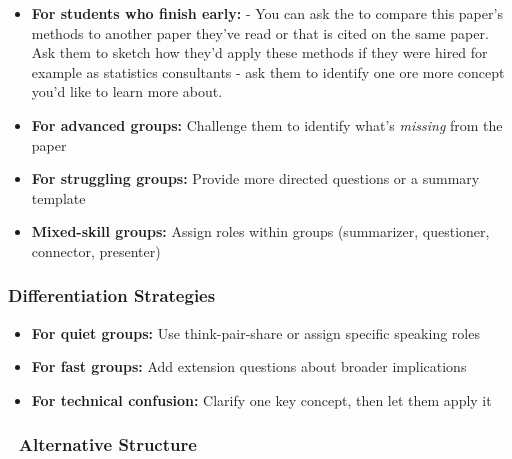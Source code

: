 \documentclass[
  letterpaper,
  DIV=11,
  numbers=noendperiod]{scrartcl}
\providecommand{\tightlist}{%
  \setlength{\itemsep}{0pt}\setlength{\parskip}{0pt}}\usepackage{longtable,booktabs,array}
\begin{document}
\begin{tcolorbox}[enhanced jigsaw, colbacktitle=quarto-callout-note-color!10!white, colframe=quarto-callout-note-color-frame, left=2mm, rightrule=.15mm, breakable, bottomrule=.15mm, toptitle=1mm, arc=.35mm, toprule=.15mm, coltitle=black, colback=white, opacityback=0, bottomtitle=1mm, titlerule=0mm, title=\textcolor{quarto-callout-note-color}{\faInfo}\hspace{0.5em}{Note}, opacitybacktitle=0.6, leftrule=.75mm]

\begin{itemize}
\item
  \textbf{For students who finish early:} - You can ask the to compare
  this paper's methods to another paper they've read or that is cited on
  the same paper. Ask them to sketch how they'd apply these methods if
  they were hired for example as statistics consultants - ask them to
  identify one ore more concept you'd like to learn more about.
\item
  \textbf{For advanced groups:} Challenge them to identify what's
  \emph{missing} from the paper
\item
  \textbf{For struggling groups:} Provide more directed questions or a
  summary template
\item
  \textbf{Mixed-skill groups:} Assign roles within groups (summarizer,
  questioner, connector, presenter)
\end{itemize}

\end{tcolorbox}

\subsubsection{Differentiation
Strategies}\label{differentiation-strategies}

\begin{itemize}
\tightlist
\item
  \textbf{For quiet groups:} Use think-pair-share or assign specific
  speaking roles
\item
  \textbf{For fast groups:} Add extension questions about broader
  implications
\item
  \textbf{For technical confusion:} Clarify one key concept, then let
  them apply it
\end{itemize}

\subsubsection{🔄 Alternative Structure}\label{alternative-structure}
\end{document}
